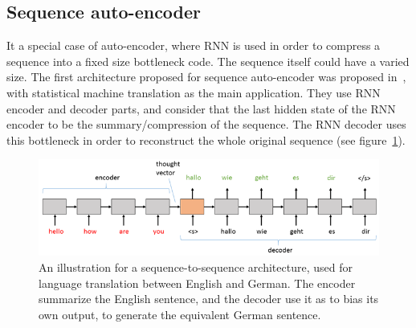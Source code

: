   \subsection{Sequence auto-encoder}
    It a special case of auto-encoder, where RNN is used in order to compress a sequence into a fixed size bottleneck code. The sequence itself could have a varied size. The first architecture proposed for sequence auto-encoder was proposed in~\citep{cho2014learning,sutskever2014sequence}, with statistical machine translation as the main application. They use RNN encoder and decoder parts, and consider that the last hidden state of the RNN encoder to be the summary/compression of the sequence. The RNN decoder uses this bottleneck in order to reconstruct the whole original sequence (see figure~\ref{fig:seq2seq}).

    \begin{figure}
      \centering
      \includegraphics[scale=0.8]{images/framework/SequencetoS2.png}
      \caption{An illustration for a sequence-to-sequence architecture, used for language translation between English and German. The encoder summarize the English sentence, and the decoder use it as to bias its own output, to generate the equivalent German sentence.}
      \label{fig:seq2seq}
    \end{figure}

